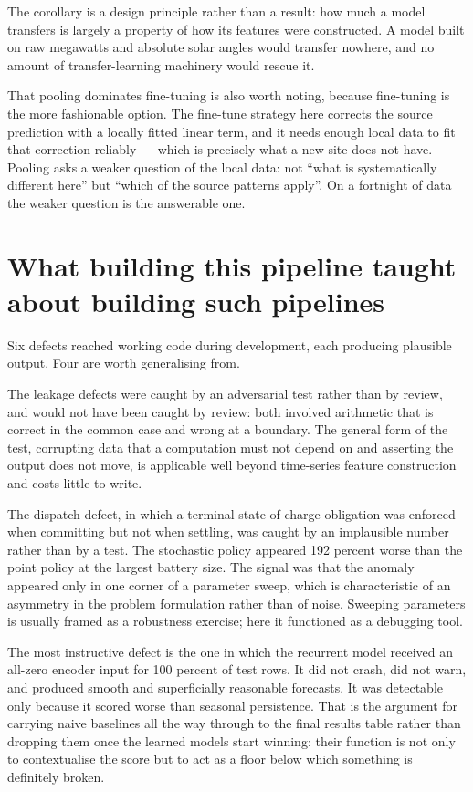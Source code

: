 \documentclass[11pt,a4paper,oneside]{report}
\begin{document}
The corollary is a design principle rather than a result: how much a model transfers is largely a property of how its features were constructed. A model built on raw megawatts and absolute solar angles would transfer nowhere, and no amount of transfer-learning machinery would rescue it.

That pooling dominates fine-tuning is also worth noting, because fine-tuning is the more fashionable option. The fine-tune strategy here corrects the source prediction with a locally fitted linear term, and it needs enough local data to fit that correction reliably --- which is precisely what a new site does not have. Pooling asks a weaker question of the local data: not ``what is systematically different here'' but ``which of the source patterns apply''. On a fortnight of data the weaker question is the answerable one.

\section{What building this pipeline taught about building such pipelines}

Six defects reached working code during development, each producing plausible output. Four are worth generalising from.

The leakage defects were caught by an adversarial test rather than by review, and would not have been caught by review: both involved arithmetic that is correct in the common case and wrong at a boundary. The general form of the test, corrupting data that a computation must not depend on and asserting the output does not move, is applicable well beyond time-series feature construction and costs little to write.

The dispatch defect, in which a terminal state-of-charge obligation was enforced when committing but not when settling, was caught by an implausible number rather than by a test. The stochastic policy appeared 192 percent worse than the point policy at the largest battery size. The signal was that the anomaly appeared only in one corner of a parameter sweep, which is characteristic of an asymmetry in the problem formulation rather than of noise. Sweeping parameters is usually framed as a robustness exercise; here it functioned as a debugging tool.

The most instructive defect is the one in which the recurrent model received an all-zero encoder input for 100 percent of test rows. It did not crash, did not warn, and produced smooth and superficially reasonable forecasts. It was detectable only because it scored worse than seasonal persistence. That is the argument for carrying naive baselines all the way through to the final results table rather than dropping them once the learned models start winning: their function is not only to contextualise the score but to act as a floor below which something is definitely broken.
\end{document}
